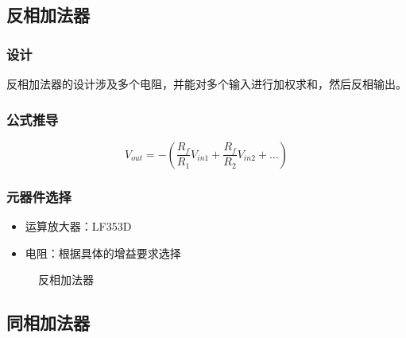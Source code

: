 \documentclass[UTF8,titlepage,a4paper]{ctexart}
\numberwithin{figure}{section}
\begin{document}
\subsection{反相加法器}

\subsubsection{设计}
反相加法器的设计涉及多个电阻，并能对多个输入进行加权求和，然后反相输出。

\subsubsection{公式推导}
\[ V_{out} = - \left( \frac{R_f}{R_1} V_{in1} + \frac{R_f}{R_2} V_{in2} + \ldots \right) \]

\subsubsection{元器件选择}
\begin{itemize}
    \item 运算放大器：LF353D
    \item 电阻：根据具体的增益要求选择
\end{itemize}
\begin{figure}[H]
\centering
 \caption{反相加法器}
 \label{}
\end{figure}
\subsection{同相加法器}
\end{document}
